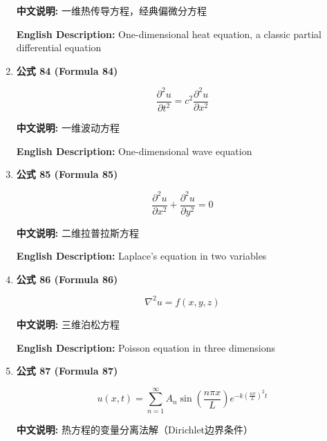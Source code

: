 \documentclass[12pt,a4paper]{article}
\begin{document}
\begin{enumerate}[leftmargin=*]
\textbf{中文说明:} 一维热传导方程，经典偏微分方程

\textbf{English Description:} One-dimensional heat equation, a classic partial differential equation

\vspace{0.5cm}

\item \textbf{公式 84 (Formula 84)}

\begin{equation}
\frac{\partial^2 u}{\partial t^2} = c^2 \frac{\partial^2 u}{\partial x^2}
\end{equation}

\textbf{中文说明:} 一维波动方程

\textbf{English Description:} One-dimensional wave equation

\vspace{0.5cm}

\item \textbf{公式 85 (Formula 85)}

\begin{equation}
\frac{\partial^2 u}{\partial x^2} + \frac{\partial^2 u}{\partial y^2} = 0
\end{equation}

\textbf{中文说明:} 二维拉普拉斯方程

\textbf{English Description:} Laplace's equation in two variables

\vspace{0.5cm}

\item \textbf{公式 86 (Formula 86)}

\begin{equation}
\nabla^2 u = f(x, y, z)
\end{equation}

\textbf{中文说明:} 三维泊松方程

\textbf{English Description:} Poisson equation in three dimensions

\vspace{0.5cm}

\item \textbf{公式 87 (Formula 87)}

\begin{equation}
u(x, t) = \sum_{n=1}^\infty A_n \sin\left(\frac{n\pi x}{L}\right) e^{-k\left(\frac{n\pi}{L}\right)^2 t}
\end{equation}

\textbf{中文说明:} 热方程的变量分离法解（Dirichlet边界条件）


\end{enumerate}
\end{document}
